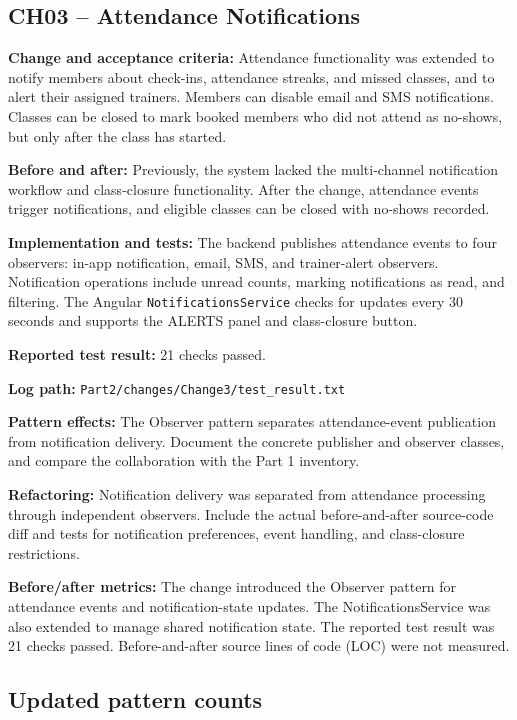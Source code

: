 \documentclass[11pt,a4paper]{article}
\begin{document}
\subsection*{CH03 -- Attendance Notifications}

\textbf{Change and acceptance criteria:}
Attendance functionality was extended to notify members about
check-ins, attendance streaks, and missed classes, and to alert
their assigned trainers. Members can disable email and SMS
notifications. Classes can be closed to mark booked members who
did not attend as no-shows, but only after the class has started.

\textbf{Before and after:}
Previously, the system lacked the multi-channel notification
workflow and class-closure functionality. After the change,
attendance events trigger notifications, and eligible classes
can be closed with no-shows recorded.

\textbf{Implementation and tests:}
The backend publishes attendance events to four observers:
in-app notification, email, SMS, and trainer-alert observers.
Notification operations include unread counts, marking
notifications as read, and filtering. The Angular
\texttt{NotificationsService} checks for updates every 30 seconds
and supports the ALERTS panel and class-closure button.

\textbf{Reported test result:} 21 checks passed.


\textbf{Log path:}
\texttt{Part2/changes/Change3/test\_result.txt}

\textbf{Pattern effects:}
The Observer pattern separates attendance-event publication
from notification delivery. Document the concrete publisher
and observer classes, and compare the collaboration with
the Part 1 inventory.

\textbf{Refactoring:}
Notification delivery was separated from attendance processing
through independent observers. Include the actual before-and-after
source-code diff and tests for notification preferences, event
handling, and class-closure restrictions.

\textbf{Before/after metrics:}
The change introduced the Observer pattern for attendance events
and notification-state updates. The NotificationsService was
also extended to manage shared notification state. The reported
test result was 21 checks passed. Before-and-after source lines
of code (LOC) were not measured.

\subsection{Updated pattern counts}
\end{document}
